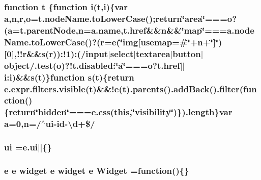 \hypertarget{static_2root_2js_2jquery-ui_8custom_8min_8js_a23c5666e83bbbceee94adcd0851f50c4}{
\subsubsection[{t}]{\setlength{\rightskip}{0pt plus 5cm}function t \{function {\bf i}(t,{\bf i})\{var {\bf a},{\bf n},{\bf r},{\bf o}=t.\-node\-Name.\-to\-Lower\-Case();return\char`\"{}area\char`\"{}===o?({\bf a}=t.\-parent\-Node,{\bf n}=a.\-name,t.\-href\&\&{\bf n}\&\&\char`\"{}map\char`\"{}===a.\-node\-Name.\-to\-Lower\-Case()?({\bf r}={\bf e}(\char`\"{}img\mbox{[}usemap=\#\char`\"{}+n+\char`\"{}\mbox{]}\char`\"{})\mbox{[}0\mbox{]},!!{\bf r}\&\&{\bf s}({\bf r}))\-:!1)\-:(/input$\vert$select$\vert$textarea$\vert${\bf button}$\vert$object/.test({\bf o})?!t.\-disabled\-:\char`\"{}a\char`\"{}===o?t.\-href$\vert$$\vert$i\-:i)\&\&{\bf s}(t)\}function {\bf s}(t)\{return {\bf e.\-expr.\-filters.\-visible}(t)\&\&!{\bf e}(t).parents().add\-Back().filter(function()\{return\char`\"{}hidden\char`\"{}===e.\-css(this,\char`\"{}visibility\char`\"{})\}).length\}var {\bf a}=0,{\bf n}=/$^\wedge${\bf ui}-\/id-\/\textbackslash{}{\bf d}+\$/}}\label{static_2root_2js_2jquery-ui_8custom_8min_8js_a23c5666e83bbbceee94adcd0851f50c4}
\hypertarget{static_2root_2js_2jquery-ui_8custom_8min_8js_a8ebc3a47bff7b1c2623695f3db4c0761}{
\subsubsection[{ui}]{ ui =e.\-ui$\vert$$\vert$\{\}}}\label{static_2root_2js_2jquery-ui_8custom_8min_8js_a8ebc3a47bff7b1c2623695f3db4c0761}
\hypertarget{static_2root_2js_2jquery-ui_8custom_8min_8js_ac276e64ad973eca0aa49ec12c72d57ef}{
\subsubsection[{Widget}]{ {\bf e} {\bf e} {\bf widget} {\bf e} {\bf widget} {\bf e} Widget =function()\{\}}}\label{static_2root_2js_2jquery-ui_8custom_8min_8js_ac276e64ad973eca0aa49ec12c72d57ef}
